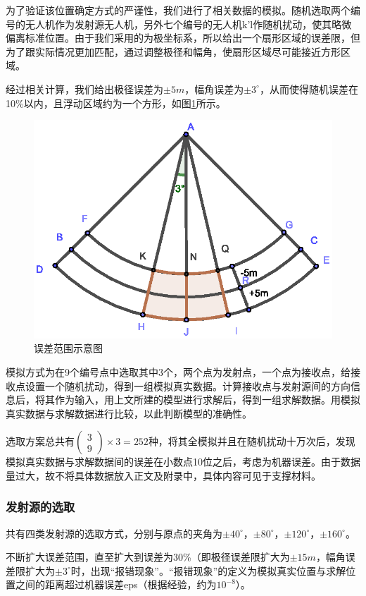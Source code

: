\documentclass{ctexart}
\begin{document}
为了验证该位置确定方式的严谨性，我们进行了相关数据的模拟。随机选取两个编号的无人机作为发射源无人机，另外七个编号的无人机k'l作随机扰动，使其略微偏离标准位置。由于我们采用的为极坐标系，所以给出一个扇形区域的误差限，但为了跟实际情况更加匹配，通过调整极径和幅角，使扇形区域尽可能接近方形区域。

经过相关计算，我们给出极径误差为$\pm 5m $，幅角误差为$\pm 3^{\circ}$，从而使得随机误差在10\%以内，且浮动区域约为一个方形，如图\ref{误差范围示意图}所示。

\begin{figure}[htbp]
  \centering
  \includegraphics[width=0.45\linewidth]{pic/error area.eps}
  \caption{误差范围示意图}
  \label{误差范围示意图}
  \end{figure}

模拟方式为在9个编号点中选取其中3个，两个点为发射点，一个点为接收点，给接收点设置一个随机扰动，得到一组模拟真实数据。计算接收点与发射源间的方向信息后，将其作为输入，用上文所建的模型进行求解后，得到一组求解数据。用模拟真实数据与求解数据进行比较，以此判断模型的准确性。

选取方案总共有$\begin{pmatrix} 3 \\ 9 \end{pmatrix}\times 3=252$种，将其全模拟并且在随机扰动十万次后，发现模拟真实数据与求解数据间的误差在小数点10位之后，考虑为机器误差。由于数据量过大，故不将具体数据放入正文及附录中，具体内容可见于支撑材料。

\subsubsection{发射源的选取}

共有四类发射源的选取方式，分别与原点的夹角为$\pm 40^{\circ}$，$\pm 80^{\circ}$，$\pm 120^{\circ}$，$\pm 160^{\circ}$。

不断扩大误差范围，直至扩大到误差为30\%（即极径误差限扩大为$\pm 15m$，幅角误差限扩大为$\pm 3^{\circ}$时，出现“报错现象”。“报错现象”的定义为模拟真实位置与求解位置之间的距离超过机器误差eps（根据经验，约为$10^{-8}$）。
\end{document}
